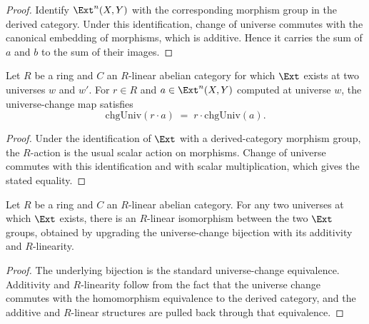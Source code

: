 \begin{proof}

\leanok
  Identify \(\Ext^n(X,Y)\) with the corresponding morphism group in the derived category. Under this identification, change of universe commutes with the canonical embedding of morphisms, which is additive. Hence it carries the sum of \(a\) and \(b\) to the sum of their images.
\end{proof}

\begin{lemma}\leanok
  \label{lem:Abelian_Ext_chgUniv_smul}
  Let \(R\) be a ring and \(C\) an \(R\)-linear abelian category for which \(\Ext\) exists at two universes \(w\) and \(w'\). For \(r \in R\) and \(a \in \Ext^{n}(X, Y)\) computed at universe \(w\), the universe-change map satisfies
  \[
    \mathrm{chgUniv}(r \cdot a) \;=\; r \cdot \mathrm{chgUniv}(a).
  \]
\end{lemma}

\begin{proof}

\leanok
  Under the identification of \(\Ext\) with a derived-category morphism group, the \(R\)-action is the usual scalar action on morphisms. Change of universe commutes with this identification and with scalar multiplication, which gives the stated equality.
\end{proof}

\begin{definition}\leanok
  \label{def:Abelian_Ext_chgUnivLinearEquiv}
  Let \(R\) be a ring and \(C\) an \(R\)-linear abelian category. For any two universes at which \(\Ext\) exists, there is an \(R\)-linear isomorphism between the two \(\Ext\) groups, obtained by upgrading the universe-change bijection with its additivity and \(R\)-linearity.
\end{definition}

\begin{proof}

\leanok
  The underlying bijection is the standard universe-change equivalence. Additivity and \(R\)-linearity follow from the fact that the universe change commutes with the homomorphism equivalence to the derived category, and the additive and \(R\)-linear structures are pulled back through that equivalence.
\end{proof}

